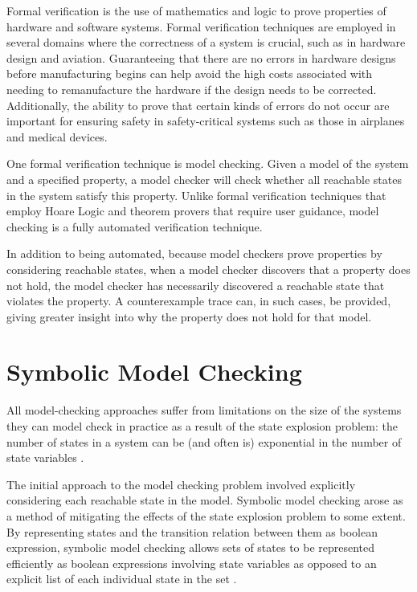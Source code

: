 \documentclass[12pt,a4paper,twoside,openright]{report}
\begin{document}
Formal verification is the use of mathematics and logic to prove properties of
hardware and software systems. Formal verification techniques are
employed in several domains where the correctness of a system is
crucial, such as in hardware design and aviation.
Guaranteeing that there are no errors in hardware designs before
manufacturing begins can help avoid the high costs associated with needing to
remanufacture the hardware if the design needs to be corrected.
Additionally, the ability to prove that certain kinds of errors do not
occur are important for ensuring safety in safety-critical systems such
as those in airplanes and medical devices.

One formal verification technique is model checking.
Given a model of the system
and a specified property, a model checker will check
whether all reachable states in the system satisfy this property.
Unlike formal verification techniques that employ Hoare Logic
and theorem provers that require user guidance, model checking
is a fully automated verification technique.

In addition to being automated, because model checkers prove
properties by considering reachable states, when a model checker
discovers that a property does not hold, the model checker has
necessarily discovered a reachable state that violates the property.
A counterexample trace can, in such cases, be provided, giving
greater insight into why the property does not hold for that
model.


\section{Symbolic Model Checking}

All model-checking approaches suffer from limitations on the size
of the systems they can model check in practice as a result of
the state explosion problem: the number of
states in a system can be (and often is) exponential in the
number of state variables \cite{clarke12}. 

The initial approach to the model checking problem involved explicitly
considering each reachable state in the model.
Symbolic model checking arose as a method of mitigating the effects of
the state explosion problem to some extent. By representing
states and the transition relation between them as boolean
expression, symbolic model checking allows sets of states to be
represented efficiently as boolean expressions involving state variables
as opposed to an explicit list of each individual state in the set
\cite{mcmillan92}. 
\end{document}
